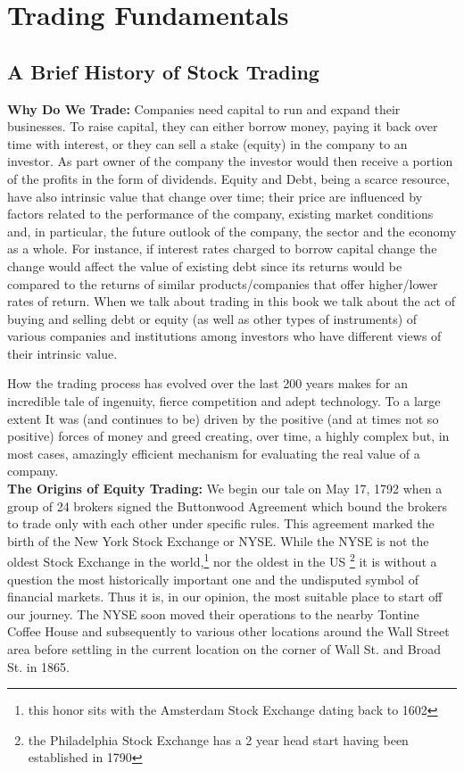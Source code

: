 \chapter{Trading Fundamentals \label{chap:ch_trading_fund}}
\section{A Brief History of Stock Trading}

\noindent\textbf{Why Do We Trade:} Companies need capital to run and expand their businesses. To raise capital, they can either borrow money, paying it back over time with interest, or they can sell a stake (equity) in the company to an investor. As part owner of the company the investor would then receive a portion of the profits in the form of dividends. Equity and Debt, being a scarce resource, have also intrinsic value that change over time; their price are influenced by factors related to the performance of the company, existing market conditions and, in particular, the future outlook of the company, the sector and the economy as a whole. For instance, if interest rates charged to borrow capital change the change would affect the value of existing debt since its returns would be compared to the returns of similar products/companies that offer higher/lower rates of return. When we talk about trading in this book we talk about the act of buying and selling debt or equity (as well as other types of instruments) of various companies and institutions among investors who have different views of their intrinsic value.


How the trading process has evolved over the last 200 years makes for an incredible tale of ingenuity, fierce competition and adept technology. To a large extent It was (and continues to be) driven by the positive (and at times not so positive) forces of money and greed creating, over time, a highly complex but, in most cases, amazingly efficient mechanism for evaluating the real value of a company. \\


\noindent\textbf{The Origins of Equity Trading:} We begin our tale on May 17, 1792 when a group of 24 brokers signed the Buttonwood Agreement which bound the brokers to trade only with each other under specific rules. This agreement marked the birth of the New York Stock Exchange or NYSE. While the NYSE is not the oldest Stock Exchange in the world,\footnote{this honor sits with the Amsterdam Stock Exchange dating back to 1602} nor the oldest in the US \footnote{the Philadelphia Stock Exchange has a 2 year head start having been established in 1790} it is without a question the most historically important one and the undisputed symbol of financial markets. Thus it is, in our opinion, the most suitable place to start off our journey. The NYSE soon moved their operations to the nearby Tontine Coffee House and subsequently to various other locations around the Wall Street area before settling in the current location on the corner of Wall St. and Broad St. in 1865. \\


